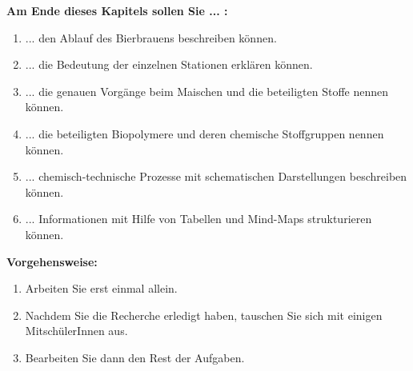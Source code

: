 \documentclass{scrartcl}  %
\begin{document}
		\begin{minipage}{0.7\textwidth}
			\noindent \textbf{Am Ende dieses Kapitels sollen Sie ... :}
			\begin{enumerate}
				\item ... den Ablauf des Bierbrauens beschreiben können.
				\item ... die Bedeutung der einzelnen Stationen erklären können.
				\item ... die genauen Vorgänge beim Maischen und die beteiligten Stoffe nennen können.
				\item ... die beteiligten Biopolymere und deren chemische Stoffgruppen nennen können.
				\item ... chemisch-technische Prozesse mit schematischen Darstellungen beschreiben können.
				\item ... Informationen mit Hilfe von Tabellen und Mind-Maps strukturieren können.
			\end{enumerate}
			\textbf{Vorgehensweise:}
			\begin{enumerate}
				\item Arbeiten Sie erst einmal allein.
				\item Nachdem Sie die Recherche erledigt haben, tauschen Sie sich mit einigen MitschülerInnen aus.
				\item Bearbeiten Sie dann den Rest der Aufgaben. 
			\end{enumerate}
			
		\end{minipage}
		\hspace{0.1\textwidth}
\end{document}
